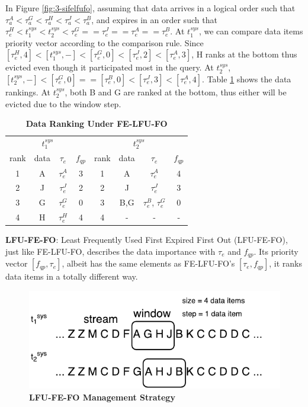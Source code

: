 In Figure \ref{fig:3-sifelfufo}, assuming that data arrives in a logical order such that $\tau^{A}_{a} < \tau^{G}_{a} < \tau^{H}_{a} < \tau^{J}_{a} < \tau^{B}_{a}$, and expires in an order such that $\tau^{H}_{e} < t^{sys}_{1} < t^{sys}_{2} < \tau^{G}_{e} == \tau^{J}_{e} == \tau^{A}_{e} == \tau^{B}_{e}$.
At $t^{sys}_{1}$, we can compare data items priority vector according to the comparison rule. 
Since $[\tau^{H}_{e}, 4] < [t^{sys}_{1}, -] < [\tau^{G}_{e}, 0] < [\tau^{J}_{e}, 2] < [\tau^{A}_{e}, 3]$, H ranks at the bottom thus evicted even though it participated most in the query. 
At $t^{sys}_{2}$, $[t^{sys}_{2}, -] < [\tau^{G}_{e}, 0] == [\tau^{B}_{e}, 0] < [\tau^{J}_{e}, 3] < [\tau^{A}_{e}, 4]$.
Table \ref{tab:felfufo} shows the data rankings. 
At $t^{sys}_{2}$, both B and G are ranked at the bottom, thus either will be evicted due to the window step. 

\begin{table}[!htbp]
\centering
\caption{\textbf{Data Ranking Under FE-LFU-FO}}
\label{tab:felfufo}
\begin{tabular}{|c|c|c|c||c|c|c|c|}
\hline
\multicolumn{4}{|c||}{$t^{sys}_{1}$} & \multicolumn{4}{c|}{$t^{sys}_{2}$} \\ \hhline{|====#====|}
rank & data & $\tau_{e}$ & $f_{qp}$ & rank & data & $\tau_{e}$ & $f_{qp}$ \\ \hhline{|=|=|=|=#=|=|=|=|}
1 & A & $\tau^{A}_{e}$ & 3 & 1 & A & $\tau^{A}_{e}$ & 4 \\ \hline
2 & J & $\tau^{J}_{e}$ & 2 & 2 & J & $\tau^{J}_{e}$ & 3 \\ \hline
3 & G & $\tau^{G}_{e}$ & 0 & 3 & B,G & $\tau^{B}_{e}$, $\tau^{G}_{e}$ & 0 \\ \hline
4 & H & $\tau^{H}_{e}$ & 4 & 4 & - & - & - \\ \hline
\end{tabular}
\end{table}

\textbf{LFU-FE-FO}:
Least Frequently Used First Expired First Out (LFU-FE-FO), just like FE-LFU-FO, describes the data importance with $\tau_{e}$ and $f_{qp}$. 
Its priority vector $[f_{qp}, \tau_{e}]$, albeit has the same elements as FE-LFU-FO's $[\tau_{e}, f_{qp}]$, it ranks data items in a totally different way. 

\begin{figure}[!htbp]
	\centering
    \includegraphics[width=5in]{img/3-silfufefo.pdf}
    \caption{\textbf{LFU-FE-FO Management Strategy}}
    \label{fig:3-silfufefo}
\end{figure}

